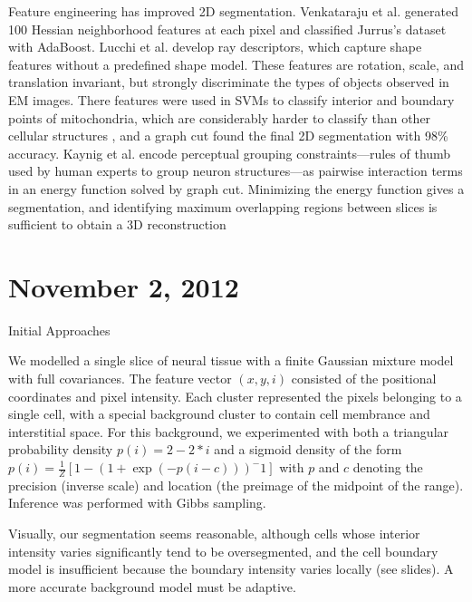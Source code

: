 \documentclass{article}
\begin{document}
Feature engineering has improved 2D segmentation. Venkataraju et al. \cite{Venkataraju2009} generated 100 Hessian neighborhood features at each pixel and classified Jurrus's dataset with AdaBoost. Lucchi et al. \cite{Lucchi2010} develop ray descriptors, which capture shape features without a predefined shape model. These features are rotation, scale, and translation invariant, but strongly discriminate the types of objects observed in EM images. There features were used in SVMs to classify interior and boundary points of mitochondria, which are considerably harder to classify than other cellular structures \cite{Kaynig2010b}, and a graph cut found the final 2D segmentation with 98\% accuracy. Kaynig et al. encode perceptual grouping constraints---rules of thumb used by human experts to group neuron structures---as pairwise interaction terms in an energy function solved by graph cut. Minimizing the energy function gives a segmentation, and identifying maximum overlapping regions between slices is sufficient to obtain a 3D reconstruction 

\section{November 2, 2012}
Initial Approaches

We modelled a single slice of neural tissue with a finite Gaussian mixture model with full covariances. The feature vector $(x, y, i)$ consisted of the positional coordinates and pixel intensity. Each cluster represented the pixels belonging to a single cell, with a special background cluster to contain cell membrance and interstitial space. For this background, we experimented with both a triangular probability density $p(i) = 2 - 2*i$ and a sigmoid density of the form $p(i) = \frac{1}{Z} \left[ 1 - \left( 1 + \exp(-p(i-c)) \right)^-1 \right]$ with $p$ and $c$ denoting the precision (inverse scale) and location (the preimage of the midpoint of the range). Inference was performed with Gibbs sampling.

Visually, our segmentation seems reasonable, although cells whose interior intensity varies significantly tend to be oversegmented, and the cell boundary model is insufficient because the boundary intensity varies locally (see slides). A more accurate background model must be adaptive.
\end{document}
